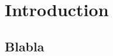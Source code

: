 
\chapter{Introduction}
\label{chapter:1}
\minitoc
\newpage
\graphicspath{{2-Chapters/1-Chapter/Images/}}

\section{Blabla}
\label{sec:blabla}

